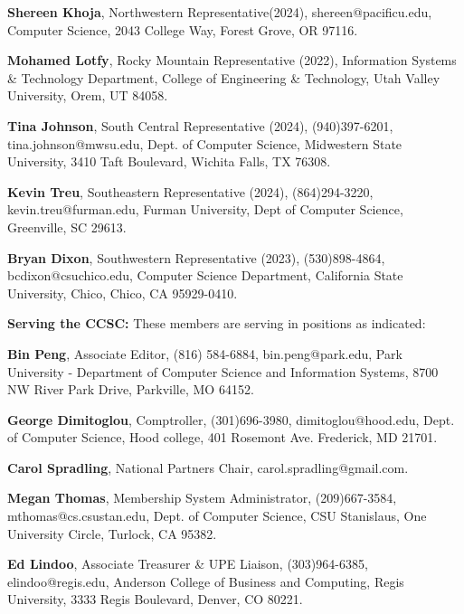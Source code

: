 \documentclass{article}
\begin{document}
\begin{multicols}{2}
\begin{raggedright}
{\noindent
\textbf{Shereen Khoja},	Northwestern Representative(2024), shereen@pacificu.edu,
Computer Science, 2043 College Way, Forest Grove, OR 97116.

\noindent
\textbf{Mohamed Lotfy}, Rocky Mountain Representative (2022), Information Systems \& Technology Department,
College of Engineering \& Technology, Utah Valley University, Orem, UT 84058.

\noindent
\textbf{Tina Johnson}, South Central Representative (2024), (940)397-6201,
tina.johnson@mwsu.edu, Dept. of Computer Science, Midwestern State University,
3410 Taft Boulevard, Wichita Falls, TX 76308.

\noindent
\textbf{Kevin Treu}, Southeastern Representative (2024), (864)294-3220,
kevin.treu@furman.edu, Furman University, Dept of Computer Science, Greenville,
SC 29613.

\noindent
\textbf{Bryan Dixon}, Southwestern Representative (2023), (530)898-4864,
bcdixon@csuchico.edu, Computer Science Department, California State University,
Chico, Chico, CA 95929-0410.

\vspace{0.2in}
\noindent
\textbf{Serving the CCSC:} These members are serving in positions as indicated:

\noindent
\textbf{Bin Peng}, Associate Editor, (816) 584-6884,
bin.peng@park.edu, Park University - Department of Computer Science and
Information Systems, 8700 NW River Park Drive, Parkville, MO 64152.

\noindent
\textbf{George Dimitoglou}, Comptroller, (301)696-3980, dimitoglou@hood.edu,
Dept. of Computer Science, Hood college,
401 Rosemont Ave. Frederick, MD 21701.

\noindent
\textbf{Carol Spradling}, National Partners Chair, carol.spradling@gmail.com.

\noindent
\textbf{Megan Thomas}, Membership System Administrator, (209)667-3584,
mthomas@cs.csustan.edu, Dept. of Computer Science, CSU Stanislaus,
One University Circle, Turlock, CA 95382.

\noindent
\textbf{Ed Lindoo}, Associate Treasurer \& UPE Liaison, (303)964-6385, elindoo@regis.edu,
Anderson College of Business and Computing, Regis University, 3333 Regis Boulevard, Denver, CO 80221.

}

\end{raggedright}
\end{multicols}
\end{document}
